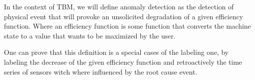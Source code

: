 \documentclass[../../main/main.tex]{subfiles}
\begin{document}
In the context of TBM, we will define anomaly detection as the detection
of physical event that will provoke an unsolicited degradation of a given
efficiency function. Where an efficiency function is some function that converts
the machine state to a value that wants to be maximized by the user.

One can prove that this definition is a special cases of the labeling one,
by labeling the decrease of the given efficiency function and retroactively
the time series of sensors witch where influenced by the root cause event.
\end{document}
